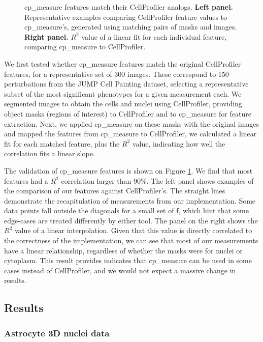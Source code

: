 \documentclass{article}
\begin{document}
\begin{figure}[htbp]
\centering

\caption{\label{fig:cp_vs_cpmeasure}cp\_measure features match their CellProfiler analogs. \textbf{Left panel.} Representative examples comparing CellProfiler feature values to cp\_measure's, generated using matching pairs of masks and images. \textbf{Right panel.} \(R^2\) value of a linear fit for each individual feature, comparing cp\_measure to CellProfiler.}
\end{figure}

We first tested whether cp\_measure features match the original CellProfiler features, for a representative set of 300 images. These correspond to 150 perturbations from the JUMP Cell Painting dataset\citep{chandrasekaranJUMPCellPainting2023}, selecting a representative subset of the most significant phenotypes for a given measurement each. We segmented images to obtain the cells and nuclei using CellProfiler, providing object masks (regions of interest) to CellProfiler and to cp\_measure for feature extraction. Next, we applied cp\_measure on these masks with the original images and mapped the features from cp\_measure to CellProfiler, we calculated a linear fit for each matched feature, plus the \(R^2\) value, indicating how well the correlation fits a linear slope.

The validation of cp\_measure features is shown on Figure \ref{fig:cp_vs_cpmeasure}. We find that most features had a $R^2$ correlation larger than 90\%. The left panel shows examples of the comparison of our features against CellProfiler's. The straight lines demonstrate the recapitulation of measurements from our implementation. Some data points fall outside the diagonals for a small set of f, which hint that some edge-cases are treated differently by either tool. The panel on the right shows the \(R^2\) value of a linear interpolation. Given that this value is directly correlated to the correctness of the implementation, we can see that most of our measurements have a linear relationship, regardless of whether the masks were for nuclei or cytoplasm. This result provides indicates that cp\_measure can be used in some cases instead of CellProfiler, and we would not expect a massive change in results.
\subsection{Results}
\label{sec:orge5b5c6b}
\subsubsection{Astrocyte 3D nuclei data}
\label{sec:org447090b}
\end{document}
